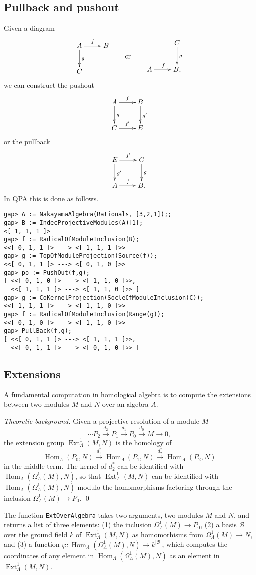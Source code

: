\documentclass{amsart}
\newcommand{\Hom}{\operatorname{Hom}\nolimits}
\newcommand{\Ext}{\operatorname{Ext}\nolimits}
\theoremstyle{definition}
\newcommand{\code}[1]{\texttt{#1}}
\theoremstyle{theoretic}
\newenvironment{theoback}
{\medskip\small\textit{Theoretic background.} }
{\qed\par\medskip}
\begin{document}
\subsection{Pullback and pushout}
Given a diagram
\[
\vcenter{\xymatrix{A\ar[r]^f\ar[d]^g & B\\ C & }}
\qquad\text{or}\qquad
\vcenter{\xymatrix{ & C\ar[d]^g\\  A\ar[r]^f & B,}}
\]
we can construct the pushout 
\[\xymatrix{A\ar[r]^f\ar[d]^g & B\ar[d]^{g'}\\ C\ar[r]^{f'} & E}\]
or the pullback 
\[\xymatrix{E\ar[r]^{f'}\ar[d]^{g'} & C\ar[d]^g\\ A\ar[r]^f & B.}\]
In QPA this is done as follows.
\begin{verbatim}
gap> A := NakayamaAlgebra(Rationals, [3,2,1]);;
gap> B := IndecProjectiveModules(A)[1];
<[ 1, 1, 1 ]>
gap> f := RadicalOfModuleInclusion(B);
<<[ 0, 1, 1 ]> ---> <[ 1, 1, 1 ]>>
gap> g := TopOfModuleProjection(Source(f));
<<[ 0, 1, 1 ]> ---> <[ 0, 1, 0 ]>>
gap> po := PushOut(f,g);
[ <<[ 0, 1, 0 ]> ---> <[ 1, 1, 0 ]>>,
  <<[ 1, 1, 1 ]> ---> <[ 1, 1, 0 ]>> ]
gap> g := CoKernelProjection(SocleOfModuleInclusion(C));
<<[ 1, 1, 1 ]> ---> <[ 1, 1, 0 ]>>
gap> f := RadicalOfModuleInclusion(Range(g));
<<[ 0, 1, 0 ]> ---> <[ 1, 1, 0 ]>>
gap> PullBack(f,g);
[ <<[ 0, 1, 1 ]> ---> <[ 1, 1, 1 ]>>,
  <<[ 0, 1, 1 ]> ---> <[ 0, 1, 0 ]>> ]
\end{verbatim}

\subsection{Extensions}
A fundamental computation in homological algebra is to compute the
extensions between two modules $M$ and $N$ over an algebra $A$.

\begin{theoback} 
Given a projective resolution of a module $M$ 
\[\cdots P_2\xrightarrow{d_2} P_1\xrightarrow{d_1}
P_0\xrightarrow{d_0} M\to 0,\]
the extension group $\Ext^1_\Lambda(M,N)$ is the homology 
of 
\[\Hom_\Lambda(P_0,N)\xrightarrow{d_1^*} \Hom_\Lambda(P_1,N)
\xrightarrow{d_2^*} \Hom_\Lambda(P_2,N)
\]
in the middle term.  The kernel of $d_2^*$ can be identified with
$\Hom_\Lambda(\Omega^1_\Lambda(M),N)$, so that $\Ext^1_\Lambda(M,N)$
can be identified with $\Hom_\Lambda(\Omega^1_\Lambda(M),N)$ modulo
the homomorphisms factoring through the inclusion
$\Omega^1_\Lambda(M)\to P_0$.  
\end{theoback}

The function \code{ExtOverAlgebra} takes two arguments, two modules
$M$ and $N$, and returns a list of three elements: (1) the inclusion
$\Omega^1_\Lambda(M)\to P_0$, (2) a basis $\mathcal{B}$ over the
ground field $k$ of $\Ext^1_\Lambda(M,N)$ as homomorhisms from
$\Omega^1_\Lambda(M)\to N$, and (3) a function $\varphi\colon
\Hom_\Lambda(\Omega^1_\Lambda(M),N) \to k^{|\mathcal{B}|}$, which
computes the coordinates of any element in
$\Hom_\Lambda(\Omega^1_\Lambda(M),N)$  as an element in
$\Ext^1_\Lambda(M,N)$. 
\end{document}
